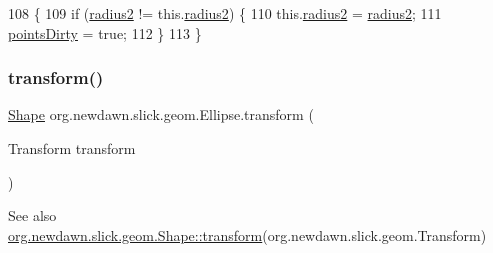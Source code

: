 \begin{DoxyCode}
108                                           \{
109         \textcolor{keywordflow}{if} (\mbox{\hyperlink{classorg_1_1newdawn_1_1slick_1_1geom_1_1_ellipse_ad3152cb17acd020ac3ae7bf70526ae9f}{radius2}} != this.\mbox{\hyperlink{classorg_1_1newdawn_1_1slick_1_1geom_1_1_ellipse_ad3152cb17acd020ac3ae7bf70526ae9f}{radius2}}) \{
110             this.\mbox{\hyperlink{classorg_1_1newdawn_1_1slick_1_1geom_1_1_ellipse_ad3152cb17acd020ac3ae7bf70526ae9f}{radius2}} = \mbox{\hyperlink{classorg_1_1newdawn_1_1slick_1_1geom_1_1_ellipse_ad3152cb17acd020ac3ae7bf70526ae9f}{radius2}};
111             \mbox{\hyperlink{classorg_1_1newdawn_1_1slick_1_1geom_1_1_shape_a61fe1954d2fdefc72c34b284f4fcfdb4}{pointsDirty}} = \textcolor{keyword}{true};
112         \}
113     \}
\end{DoxyCode}
\mbox{\label{classorg_1_1newdawn_1_1slick_1_1geom_1_1_ellipse_a100ff1837af22a13088dd9b93cc898ab}} 
\subsubsection{\texorpdfstring{transform()}{transform()}}
{\footnotesize\ttfamily \mbox{\hyperlink{classorg_1_1newdawn_1_1slick_1_1geom_1_1_shape}{Shape}} org.\+newdawn.\+slick.\+geom.\+Ellipse.\+transform (\begin{DoxyParamCaption}\item[{Transform}]{transform }\end{DoxyParamCaption})\hspace{0.3cm}{\ttfamily [inline]}}

\begin{DoxySeeAlso}{See also}
\mbox{\hyperlink{classorg_1_1newdawn_1_1slick_1_1geom_1_1_shape_a463826a085479c379e40f012e970b997}{org.\+newdawn.\+slick.\+geom.\+Shape\+::transform}}(org.\+newdawn.\+slick.\+geom.\+Transform) 
\end{DoxySeeAlso}

